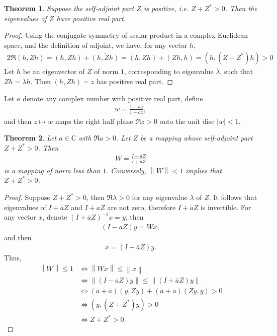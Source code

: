 \documentclass[10pt]{book}
\newtheorem{theorem}{Theorem}[chapter]
\theoremstyle{definition}
\numberwithin{equation}{chapter}
\begin{document}
\begin{theorem}
Suppose the self-adjoint part $Z$ is positive, i.e. $Z + Z^* > 0$. Then the eigenvalues of $Z$ have positive real part.
\end{theorem}
\begin{proof}
Using the conjugate symmetry of scalar product in a complex Euclidean space, and the definition of adjoint, we have, for any vector $h$,
\begin{align*}
    2 \Re (h, Zh) = (h, Zh) + \overline{(h, Zh)} = (h, Zh) + (Zh, h) = (h, (Z+Z^*)h) > 0
\end{align*}
Let $h$ be an eigenvector of $Z$ of norm $1$, corresponding to eigenvalue $\lambda$, such that $Zh = \lambda h$. Then $(h, Zh) = z$ has positive real part.
\end{proof}

\medskip

Let $a$ denote any complex number with positive real part, define
\begin{align*}
    w = \frac{1 - az}{1+\overline{a}z},
\end{align*}
and then $z \mapsto w$ maps the right half plane $\Re z > 0$ onto the unit disc $\left|w\right| < 1$. 

\medskip

\begin{theorem}
Let $a \in \mathbb{C}$ with $\Re a > 0$. Let $Z$ be a mapping whose self-adjoint part $Z + Z^* > 0$. Then
\begin{align*}
    W = \frac{I - aZ}{I + \overline{a}Z}
\end{align*}
is a mapping of norm less than $1$. Conversely, $\left\|W\right\| < 1$ implies that $Z + Z^* > 0$.
\end{theorem}
\begin{proof}
Suppose $Z + Z^* > 0$, then $\Re \lambda > 0$ for any eigenvalue $\lambda$ of $Z$. It follows that eigenvalues of $I + \overline{a} Z$ and $I + aZ$ are not zero, therefore $I + \overline{a} Z$ is invertible. For any vector $x$, denote $(I + \overline{a} Z)^{-1}x = y$, then \begin{align*}
    (I - aZ)y = Wx,
\end{align*}
and then 
\begin{align*}
    x = (I + \overline{a} Z)y.
\end{align*}
Thus,
\begin{align*}
    \left\|W\right\| \leq 1 & \Leftrightarrow \left\|Wx\right\| \leq \left\|x\right\| \\
    & \Leftrightarrow \left\|(I - aZ)y\right\| \leq \left\|(I + \overline{a} Z)y\right\| \\
    & \Leftrightarrow (a+\overline{a})(y,Zy) + (a+\overline{a})(Zy,y) > 0 \\
    & \Leftrightarrow (y, (Z+Z^*)y) > 0 \\
    & \Leftrightarrow Z+Z^* > 0.
\end{align*}
\end{proof}
\end{document}
